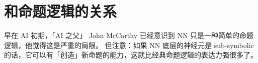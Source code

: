 \documentclass[orivec]{llncs}
\begin{document}
\section*{和命题逻辑的关系}

早在 AI 初期，「AI 之父」 John McCarthy 已经意识到 NN 只是一种简单的命题逻辑，他觉得这是严重的局限。 但注意：如果 NN 底层的神经元是 sub-symbolic 的话，它可以有「创造」新命题的能力，这就比经典命题逻辑的表达力强很多了。 



%
\end{document}
